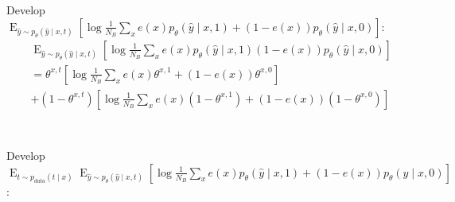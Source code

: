 \documentclass[oneside,12pt]{article}
\begin{document}
%
\\\\
Develop $
        \operatorname{E}_{\hat{y} \sim p_\theta(\hat{y} \mid x,t)}
        \left[\operatorname{log}\frac{1}{N_B}\sum_x e(x)p_\theta(\hat{y} \mid x,1) + (1-e(x))p_\theta(\hat{y} \mid x,0)\right]$:
\begin{equation}
    \begin{split}
        &\operatorname{E}_{\hat{y} \sim p_\theta(\hat{y} \mid x,t)}
        \left[\operatorname{log}\frac{1}{N_B}\sum_x e(x)p_\theta(\hat{y} \mid x,1) (1-e(x))p_\theta(\hat{y} \mid x,0)\right]\\
        &= \theta^{x,t}\left[\operatorname{log}\frac{1}{N_B}\sum_x e(x)\theta^{x,1} + (1-e(x))\theta^{x,0}\right]\\
        &+ (1-\theta^{x,t})\left[\operatorname{log}\frac{1}{N_B}\sum_x e(x)(1-\theta^{x,1}) + (1-e(x))(1-\theta^{x,0})\right]\\
    \end{split}
\end{equation}
%
\\\\
Develop $\operatorname{E}_{t \sim p_{data}(t \mid x)}
        \operatorname{E}_{\hat{y} \sim p_\theta(\hat{y} \mid x,t)}
        \left[\operatorname{log}\frac{1}{N_B}\sum_x e(x)p_\theta(\hat{y} \mid x,1) + (1-e(x))p_\theta(\hat{y} \mid x,0)\right]$:
\end{document}
